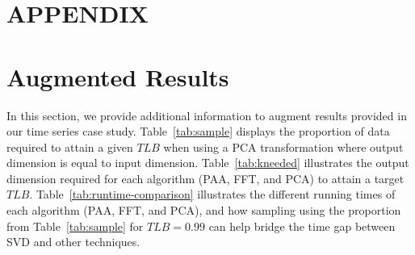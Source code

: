 \appendix
\section*{APPENDIX}

\section{Augmented Results}


In this section, we provide additional information to augment results provided in our time series case study. 
Table~\ref{tab:sample} displays the proportion of data required to attain a given $TLB$ when using a PCA transformation where output dimension is equal to input dimension. Table~\ref{tab:kneeded} illustrates the output dimension required for each algorithm (PAA, FFT, and PCA) to attain a target $TLB$. 
Table~\ref{tab:runtime-comparison} illustrates the different running times of each algorithm (PAA, FFT, and PCA), and how sampling using the proportion from Table~\ref{tab:sample} for $TLB=0.99$ can help bridge the time gap between SVD and other techniques. 


